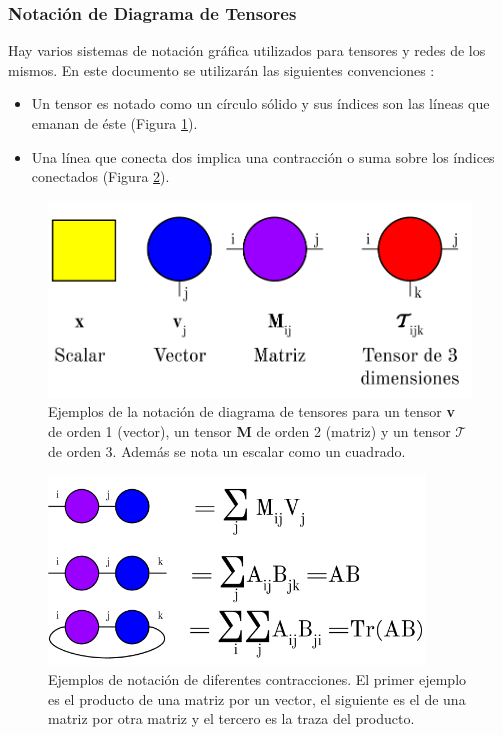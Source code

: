 \documentclass[spanish]{article}
\theoremstyle{definition}
\theoremstyle{remark}
\numberwithin{equation}{section}
\numberwithin{equation}{section} %
\begin{document}
\subsubsection{Notación de Diagrama de Tensores}
Hay varios sistemas de notación gráfica utilizados para tensores y redes de los mismos. En este documento se utilizarán las siguientes convenciones \cite{tensornetwork.org}:
\begin{itemize}
\item Un tensor es notado como un círculo sólido y sus índices son las líneas que emanan de éste (Figura \ref{fig:ejemplo_notacion}). 
\item Una línea que conecta dos implica una contracción o suma sobre los índices conectados (Figura \ref{fig:ejemplo_contraccion}). 
\end{itemize}
\begin{figure}[H]
 \centering
 \includegraphics[width=12cm]{img/ejemplos_tensores.png}
\caption[Ejemplos notación de diagrama de tensores]{\footnotesize{ Ejemplos de la notación de diagrama de tensores para un tensor \textbf{v} de orden 1 (vector), un tensor \textbf{M} de orden 2 (matriz) y un tensor \textbf{$\mathcal{T}$} de orden 3. Además se nota un escalar como un cuadrado.}} 
\label{fig:ejemplo_notacion}
\end{figure}
\begin{figure}[H]
 \centering
 \includegraphics[width=10cm]{img/ejemplo_contracciones_tensores.png}
\caption[Ejemplos notación de diferentes contracciones]{\footnotesize{Ejemplos de notación de diferentes contracciones. El primer ejemplo es el producto de una matriz por un vector, el siguiente es el de una matriz por otra matriz y el tercero es la traza del producto. }} 
\label{fig:ejemplo_contraccion}
\end{figure}
\end{document}
